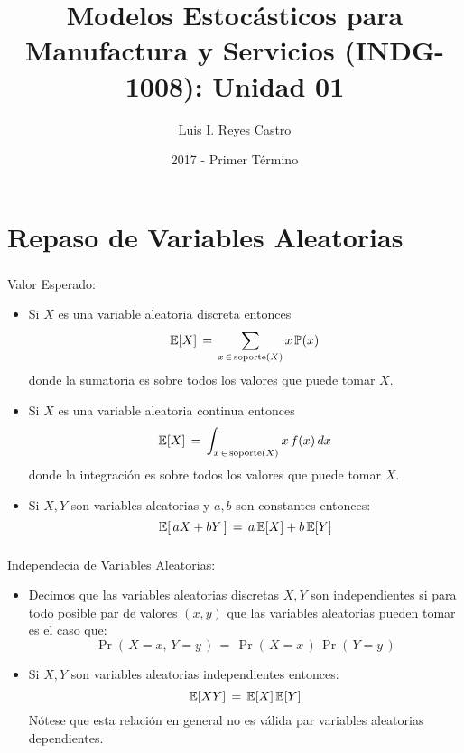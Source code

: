 \documentclass[ 10pt, xcolor = dvipsnames]{beamer}
\title[\shorttitle]{Modelos Estoc\'asticos para Manufactura y Servicios (INDG-1008): \textbf{Unidad 01} }
\author[L. I. Reyes Castro]{Luis I. Reyes Castro}
\institute[ESPOL]{\normalsize Escuela Superior Polit\'ecnica del Litoral (ESPOL) \\ Guayaquil - Ecuador}
\date[2017-T1]{2017 - Primer T\'ermino}
\begin{document}



\section{Repaso de Variables Aleatorias}

\begin{frame}[allowframebreaks]
\frametitle{\insertsection}

Valor Esperado: 
\begin{itemize}
\item Si $X$ es una variable aleatoria discreta entonces 
\[
\mathbb{E}[X] \, = \, \sum_{ x \, \in \, \text{soporte}(X) } x \, \mathbb{P}(x)
\]
donde la sumatoria es sobre todos los valores que puede tomar $X$. 
\item Si $X$ es una variable aleatoria continua entonces 
\[
\mathbb{E}[X] \, = \, \int_{ x \, \in \, \text{soporte}(X) } x \, f(x) \, dx
\]
donde la integraci\'on es sobre todos los valores que puede tomar $X$. 
\item Si $X,Y$ son variables aleatorias y $a,b$ son constantes entonces: 
\[
\mathbb{E}[ \, a X + b Y \, ] \, = \, a \, \mathbb{E}[X] + b \, \mathbb{E}[Y]
\]
\end{itemize}

\end{frame}

\begin{frame}[allowframebreaks]
\frametitle{\insertsection}

Independecia de Variables Aleatorias: 
\begin{itemize}
\item Decimos que las variables aleatorias discretas $X,Y$ son independientes si \linebreak para todo posible par de valores $(x,y)$ que las variables aleatorias \linebreak pueden tomar es el caso que: 
\[
\Pr( \, X = x, \, Y = y \, ) \, = \,
\Pr( \, X = x \, ) \, \Pr( \, Y = y \, )
\]
\item Si $X,Y$ son variables aleatorias independientes entonces: 
\[
\mathbb{E}[XY] \, = \, \mathbb{E}[X] \, \mathbb{E}[Y]
\]
N\'otese que esta relaci\'on en general no es v\'alida par variables aleatorias dependientes. 
\end{itemize}

\end{frame}
\end{document}
